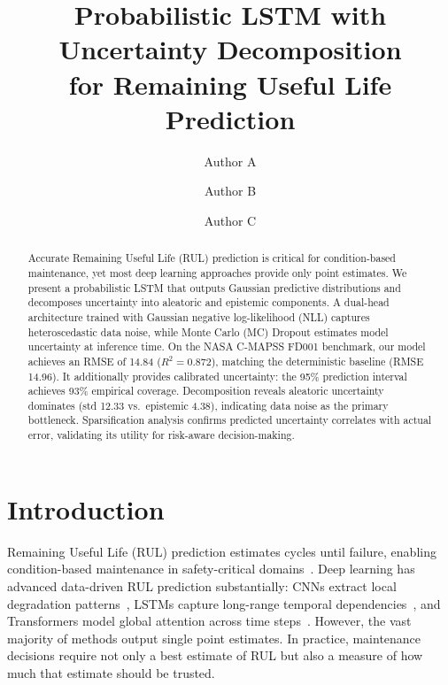 \documentclass[runningheads]{llncs}
\begin{document}
\title{Probabilistic LSTM with Uncertainty Decomposition\\for Remaining Useful Life Prediction}

\author{Author A \and Author B \and Author C}

\maketitle

\begin{abstract}
Accurate Remaining Useful Life (RUL) prediction is critical for condition-based maintenance, yet most deep learning approaches provide only point estimates.
We present a probabilistic LSTM that outputs Gaussian predictive distributions and decomposes uncertainty into aleatoric and epistemic components.
A dual-head architecture trained with Gaussian negative log-likelihood (NLL) captures heteroscedastic data noise, while Monte Carlo (MC) Dropout estimates model uncertainty at inference time.
On the NASA C-MAPSS FD001 benchmark, our model achieves an RMSE of 14.84 ($R^2{=}0.872$), matching the deterministic baseline (RMSE 14.96).
It additionally provides calibrated uncertainty: the 95\% prediction interval achieves 93\% empirical coverage.
Decomposition reveals aleatoric uncertainty dominates (std 12.33 vs.\ epistemic 4.38), indicating data noise as the primary bottleneck.
Sparsification analysis confirms predicted uncertainty correlates with actual error, validating its utility for risk-aware decision-making.

\end{abstract}

\section{Introduction}
\label{sec:intro}

Remaining Useful Life (RUL) prediction estimates cycles until failure, enabling condition-based maintenance in safety-critical domains~\cite{lei2018machinery}.
Deep learning has advanced data-driven RUL prediction substantially: CNNs extract local degradation patterns~\cite{sateesh2016deep,li2018remaining}, LSTMs capture long-range temporal dependencies~\cite{zheng2017long,wu2018remaining}, and Transformers model global attention across time steps~\cite{mo2021multi}.
However, the vast majority of methods output single point estimates.
In practice, maintenance decisions require not only a best estimate of RUL but also a measure of how much that estimate should be trusted.
\end{document}
